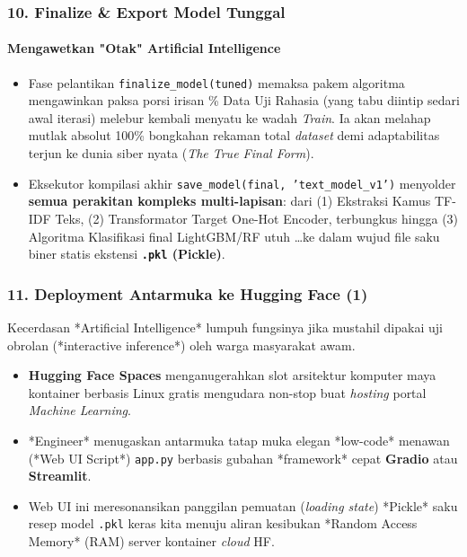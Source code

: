 \documentclass[t,aspectratio=169,xcolor=dvipsnames]{beamer}
\begin{document}
\begin{frame}
    \frametitle{10. Finalize \& Export Model Tunggal}
    \framesubtitle{Mengawetkan "Otak" Artificial Intelligence}
    \small
    \begin{itemize}
        \item Fase pelantikan \texttt{finalize\_model(tuned)} memaksa pakem algoritma mengawinkan paksa porsi irisan \% Data Uji Rahasia (yang tabu diintip sedari awal iterasi) melebur kembali menyatu ke wadah \textit{Train}. Ia akan melahap mutlak absolut 100\% bongkahan rekaman total \textit{dataset} demi adaptabilitas terjun ke dunia siber nyata (\textit{The True Final Form}).
        \item Eksekutor kompilasi akhir \texttt{save\_model(final, 'text\_model\_v1')}  menyolder \textbf{semua perakitan kompleks multi-lapisan}: dari (1) Ekstraksi Kamus TF-IDF Teks, (2) Transformator Target One-Hot Encoder, terbungkus hingga (3) Algoritma Klasifikasi final LightGBM/RF utuh \dots ke dalam wujud file saku biner statis ekstensi \textbf{\texttt{.pkl} (Pickle)}.
    \end{itemize}
\end{frame}

\begin{frame}
    \frametitle{11. Deployment Antarmuka ke Hugging Face (1)}
    \small
    Kecerdasan *Artificial Intelligence* lumpuh fungsinya jika mustahil dipakai uji obrolan (*interactive inference*) oleh warga masyarakat awam.
    \vspace{0.2cm}
    \begin{itemize}
        \item \textbf{Hugging Face Spaces} menganugerahkan slot arsitektur komputer maya kontainer berbasis Linux gratis mengudara non-stop buat \textit{hosting} portal \textit{Machine Learning}.
        \item *Engineer* menugaskan antarmuka tatap muka elegan *low-code* menawan (*Web UI Script*) \texttt{app.py} berbasis gubahan *framework* cepat \textbf{Gradio} atau \textbf{Streamlit}.
        \item Web UI ini meresonansikan panggilan pemuatan (\textit{loading state}) *Pickle* saku resep model \texttt{.pkl} keras kita menuju aliran kesibukan *Random Access Memory* (RAM) server kontainer \textit{cloud} HF.
    \end{itemize}
\end{frame}
\end{document}
